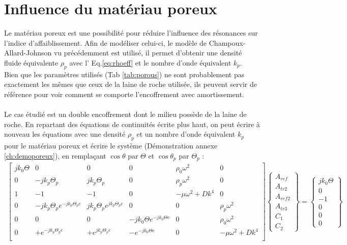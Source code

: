 \documentclass[12pt,foolscap]{report}
\begin{document}
	\section{Influence du matériau poreux}
	Le matériau poreux est une possibilité pour réduire l'influence des résonances sur l'indice d'affaiblissement. Afin de modéliser celui-ci, le modèle de Champoux-Allard-Johnson vu précédemment est utilisé, il permet d'obtenir une densité fluide équivalente $\rho_p$ avec l' Eq.\ref{eq:rhoeff} et le nombre d'onde équivalent $k_p$.
	\\ Bien que les paramètres utilisés (Tab \ref{tab:porous}) ne sont probablement pas exactement les mêmes que ceux de la laine de roche utilisée, ils peuvent servir de référence pour voir comment se comporte l'encoffrement avec amortissement.\\ \\
	Le cas étudié est un double encoffrement dont le milieu possède de la laine  de roche.
	En repartant des équations de continuités écrite plus haut, on peut écrire à nouveau les équations avec une densité $\rho_p$ et un nombre d'onde équivalent  $k_p$ pour le matériau poreux et écrire le système (Démonstration annexe \ref{ch:demoporeux}), en remplaçant $\cos \theta$ par $\Theta$ et $\cos \theta_p$ par $\Theta_p$ :
	\begin{align}	
	\begin{bmatrix}
	j k_0 \Theta    &0 & 0 &0&\rho_0\omega^2&0  \\
	0       & -j k_p \Theta_p & j k_p \Theta_p & 0 &\rho_p\omega^2 & 0  \\
	1       & -1 & -1 & 0 &-\mu \omega^2+Dk^4 & 0  \\
	0    &-j k_p \Theta_p e^{-jk_p\Theta_p e}   & j k_p \Theta_p e^{jk_p\Theta_p e}   &0&0&\rho_p\omega^2  \\
	0       & 0 & 0 &- j k_0 \Theta e^{-jk_0\Theta e} &0 & \rho_0\omega^2   \\
	0     & + e^{-jk_p\Theta_p e} & +e^{jk_p\Theta_p e} & - 	e^{-jk_0\Theta e} &0 & -\mu \omega^2+Dk^4  \\
	\end{bmatrix}
	\begin{Bmatrix}
	A_{ref} \\
	A_{tr2} \\
	A_{ref2}\\
	A_{tr3}\\
	C_{1} \\
	C_{2} 
	\end{Bmatrix}
	=\begin{Bmatrix}
	j k_0 \Theta \\
	0 \\
	-1\\
	0\\
	0 \\
	0
	\end{Bmatrix}
	\end{align}
\end{document}
